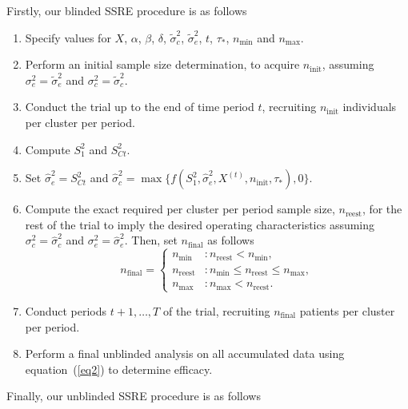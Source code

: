 \documentclass{article}
\begin{document}
Firstly, our blinded SSRE procedure is as follows
\begin{enumerate}
	\item Specify values for $X$, $\alpha$, $\beta$, $\delta$, $\tilde{\sigma}_c^2$, $\tilde{\sigma}_e^2$, $t$, $\tau_*$, $n_{\text{min}}$ and $n_{\text{max}}$.
	\item Perform an initial sample size determination, to acquire $n_{\text{init}}$, assuming $\sigma_e^2=\tilde{\sigma}_e^2$ and $\sigma_c^2=\tilde{\sigma}_c^2$.
	\item Conduct the trial up to the end of time period $t$, recruiting $n_{\text{init}}$ individuals per cluster per period.
	\item Compute $S_1^2$ and $S_{Ct}^2$.
	\item Set $\hat{\sigma}_e^2 = S_{Ct}^2$ and $\hat{\sigma}_c^2=\max\{f(S_1^2,\hat{\sigma}_e^2,X^{(t)},n_\text{init},\tau_*),0\}$.
	\item Compute the exact required per cluster per period sample size, $n_{\text{reest}}$, for the rest of the trial to imply the desired operating characteristics assuming $\sigma_c^2=\hat{\sigma}_c^2$ and $\sigma_e^2=\hat{\sigma}_e^2$. Then, set $n_{\text{final}}$ as follows
	\[ n_\text{final}=\begin{cases}
	n_\text{min} &: n_\text{reest} < n_\text{min},\\
	n_\text{reest} &: n_\text{min} \le n_\text{reest} \le n_\text{max},\\
	n_\text{max} &: n_\text{max} < n_\text{reest}.
	\end{cases} \]
	\item Conduct periods $t+1,\dots,T$ of the trial, recruiting $n_{\text{final}}$ patients per cluster per period.
	\item Perform a final unblinded analysis on all accumulated data using equation~(\ref{eq2}) to determine efficacy.
\end{enumerate}

Finally, our unblinded SSRE procedure is as follows
\end{document}
